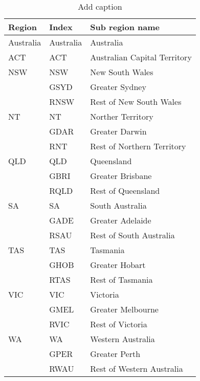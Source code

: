 \begin{table}[htbp]
  \centering
  \caption{Add caption}
    \begin{tabular}{rll}
    \toprule
    \multicolumn{1}{l}{Region} & Index & Sub region name \\
    \midrule
    \multicolumn{1}{l}{Australia} & Australia & Australia \\
    \multicolumn{1}{l}{ACT} & ACT   & Australian Capital Territory \\
    \multicolumn{1}{l}{NSW} & NSW   & New South Wales \\
          & GSYD  & Greater Sydney \\
          & RNSW  & Rest of New South Wales \\
    \multicolumn{1}{l}{NT} & NT    & Norther Territory \\
          & GDAR  & Greater Darwin \\
          & RNT   & Rest of Northern Territory \\
    \multicolumn{1}{l}{QLD} & QLD   & Queensland \\
          & GBRI  & Greater Brisbane \\
          & RQLD  & Rest of Queensland \\
    \multicolumn{1}{l}{SA} & SA    & South Australia \\
          & GADE  & Greater Adelaide \\
          & RSAU  & Rest of South Australia \\
    \multicolumn{1}{l}{TAS} & TAS   & Tasmania \\
          & GHOB  & Greater Hobart \\
          & RTAS  & Rest of Tasmania \\
    \multicolumn{1}{l}{VIC} & VIC   & Victoria \\
          & GMEL  & Greater Melbourne \\
          & RVIC  & Rest of Victoria \\
    \multicolumn{1}{l}{WA} & WA    & Western Australia \\
          & GPER  & Greater Perth \\
          & RWAU  & Rest of Western Australia \\
    \bottomrule
    \end{tabular}%
  \label{tab:addlabel}%
\end{table}%
